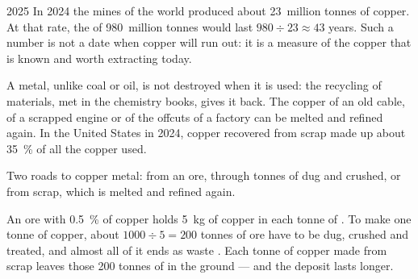 \begin{dated}{2025}
In 2024 the mines of the world produced about 23~million tonnes of copper.
At that rate, the  of 980~million tonnes would last $980 \div 23
\approx 43$ years. Such a number is not a date when copper will run out:
it is a measure of the copper that is known and worth extracting today.
\end{dated}

A metal, unlike coal or oil, is not destroyed when it is used: the
recycling of materials, met in the chemistry books, gives it back. The
copper of an old cable, of a scrapped engine or of the offcuts of a
factory can be melted and refined again. In the United States in 2024,
copper recovered from scrap made up about \qty{35}{\%} of all the copper
used.

\begin{omfigure}

{\small Two roads to copper metal: from an ore, through tonnes of 
dug and crushed, or from scrap, which is melted and refined again.}
\end{omfigure}

\begin{example}\label{ex:g9:earth-resources:recycling}
An ore with \qty{0.5}{\%} of copper holds \qty{5}{kg} of copper in each
tonne of . To make one tonne of copper, about $1000 \div 5 = 200$
tonnes of ore have to be dug, crushed and treated, and almost all of it
ends as waste . Each tonne of copper made from scrap leaves those 200
tonnes of  in the ground --- and the deposit lasts longer.
\end{example}


